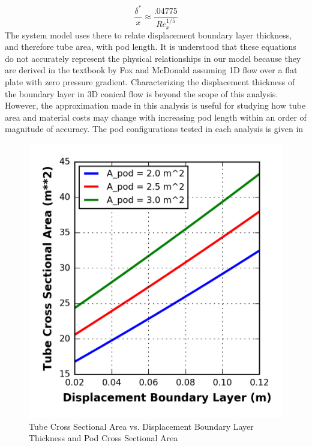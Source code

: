 \begin{equation}
	\label{eq:boundary_layer}
	\frac{\delta^{*}}{x} \approx  \frac{.04775}{Re_{x}^{1/5}}
\end{equation}
The system model uses there to relate displacement boundary layer thickness,
and therefore tube area, with pod length. It is understood that these equations
do not accurately represent the physical relationships in our model because
they are derived in the textbook by Fox and McDonald assuming 1D flow over a
flat plate with zero pressure gradient. Characterizing the displacement
thickness of the boundary layer in 3D conical flow is beyond the scope of this analysis.
However, the approximation made in this analysis is useful for studying how
tube area and material costs may change with increasing pod length within an
order of magnitude of accuracy.  The pod configurations tested in each analysis is given in
\begin{table}
	\centering
	\caption{Configurations in boundary layer sensitivity study}
	\label{tbl:boundary_layer_sensitivty_configs}
\end{table}
\begin{figure}
	\centering
	\caption{Tube Cross Sectional Area vs. Displacement Boundary Layer Thickness and Pod Cross Sectional Area}
	\label{fig:cross_sec_area_vs_disp_boundary_layer}
	\includegraphics{../../images/graphs/boundary_layer_growth_trades/Tube_Area_vs_boundary_layer.png}
\end{figure}
